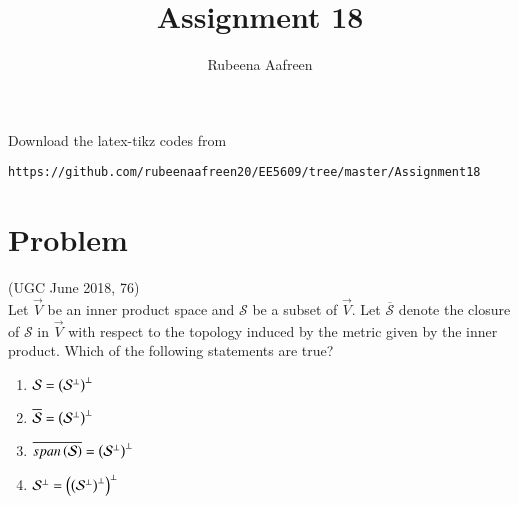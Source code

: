 \documentclass[journal,12pt]{IEEEtran}
\begin{document}
     \def\rightbox#1{\makebox[0in][r]{#1}}
     \def\centbox#1{\makebox[0in]{#1}}
     \def\topbox#1{\raisebox{-\baselineskip}[0in][0in]{#1}}
     \def\midbox#1{\raisebox{-0.5\baselineskip}[0in][0in]{#1}}
\vspace{3cm}
\title{Assignment 18}
\author{Rubeena Aafreen}
\maketitle
\bigskip
\renewcommand{\thefigure}{\theenumi}
\renewcommand{\thetable}{\theenumi}
%
Download the latex-tikz codes from 
%
\begin{lstlisting}
https://github.com/rubeenaafreen20/EE5609/tree/master/Assignment18
\end{lstlisting}
\section{\textbf{Problem}}
%
(UGC June 2018, 76)\\
Let $\vec{V}$ be an inner product space and $\mathcal{S}$ be a subset of $\vec{V}$. Let $\overline{\mathcal{S}}$ denote the closure of $\mathcal{S}$ in $\vec{V}$ with respect to the topology induced by the metric given by the inner product. Which of the following statements are true?\\
\begin{enumerate}
    \item $\mathcal{S}=\left(\mathcal{S}^{\perp}\right)^{\perp}$
    \item $\overline{\mathcal{S}}=\left(\mathcal{S}^{\perp}\right)^{\perp}$
    \item $\overline{{span\left(\mathcal{S}\right)}}=\left(\mathcal{S}^{\perp}\right)^{\perp}$
    \item $\mathcal{S}^{\perp}=\left(\left(\mathcal{S}^{\perp}\right)^{\perp}\right)^{\perp}$
\end{enumerate}
\end{document}
